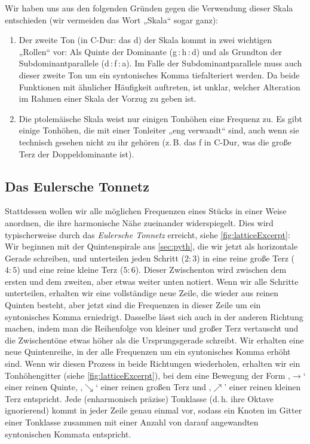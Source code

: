 Wir haben uns aus den folgenden Gründen gegen die Verwendung dieser Skala
entschieden (wir vermeiden das Wort „Skala“ sogar ganz):
\begin{enumerate}
\item Der zweite Ton (in C-Dur: das d) der Skala kommt in zwei wichtigen
  „Rollen“ vor: Als Quinte der Dominante (g\,:\,h\,:\,d) und als Grundton der
  Subdominantparallele (d\,:\,f\,:\,a). Im Falle der Subdominantparallele muss auch
  dieser zweite Ton um ein syntonisches Komma tiefalteriert werden. Da beide
  Funktionen mit ähnlicher Häufigkeit auftreten, ist unklar, welcher Alteration
  im Rahmen einer Skala der Vorzug zu geben ist.
\item Die ptolemäische Skala weist nur einigen Tonhöhen eine Frequenz zu. Es
  gibt einige Tonhöhen, die mit einer Tonleiter „eng verwandt“ sind, auch wenn
  sie technisch gesehen nicht zu ihr gehören (z.\,B. das \sharp f in C-Dur, was
  die große Terz der Doppeldominante ist).
\end{enumerate}

\subsection{Das Eulersche Tonnetz}

Stattdessen wollen wir alle möglichen Frequenzen eines Stücks in einer Weise
anordnen, die ihre harmonische Nähe zueinander widerspiegelt. Dies wird
typischerweise durch das \emph{Eulersche Tonnetz} erreicht, siehe
\cref{fig:latticeExcerpt}: Wir beginnen mit der Quintenspirale aus
\cref{sec:pyth}, die wir jetzt als horizontale Gerade schreiben, und unterteilen
jeden Schritt ($2:3$) in eine reine große Terz ($4:5$) und eine reine kleine
Terz ($5:6$). Dieser Zwischenton wird zwischen dem ersten und dem zweiten, aber
etwas weiter unten notiert. Wenn wir alle Schritte unterteilen, erhalten wir
eine vollständige neue Zeile, die wieder aus reinen Quinten besteht, aber jetzt
sind die Frequenzen in dieser Zeile um ein syntonisches Komma
erniedrigt. Dasselbe lässt sich auch in der anderen Richtung machen, indem man
die Reihenfolge von kleiner und großer Terz vertauscht und die Zwischentöne
etwas höher als die Ursprungsgerade schreibt. Wir erhalten eine neue
Quintenreihe, in der alle Frequenzen um ein syntonisches Komma erhöht sind. Wenn
wir diesen Prozess in beide Richtungen wiederholen, erhalten wir ein
Tonhöhengitter (siehe \cref{fig:latticeExcerpt}), bei dem eine Bewegung der Form
‚$\to$‘ einer reinen Quinte, ‚$\searrow$‘ einer reinen großen Terz und
‚$\nearrow$’ einer reinen kleinen Terz entspricht. Jede (enharmonisch präzise)
Tonklasse (d.\,h. ihre Oktave ignorierend) kommt in jeder Zeile genau einmal
vor, sodass ein Knoten im Gitter einer Tonklasse zusammen mit einer Anzahl von
darauf angewandten syntonischen Kommata entspricht.%

